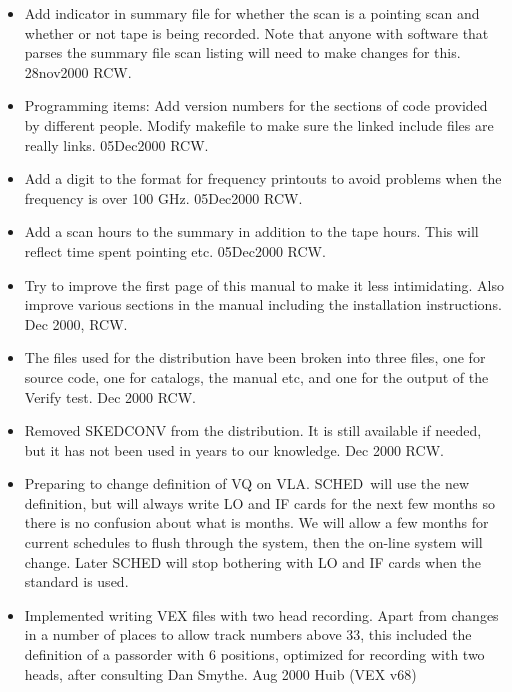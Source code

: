 \documentclass{report}
\newcommand{\schedb}{{\sc SCHED~}}
\begin{document}
\begin{itemize}
\item Add indicator in summary file for whether the scan is a pointing
      scan and whether or not tape is being recorded.  Note that
      anyone with software that parses the summary file scan listing
      will need to make changes for this.  28nov2000 RCW.

\item Programming items:  Add version numbers for the sections of
      code provided by different people.  Modify makefile to make
      sure the linked include files are really links.  05Dec2000 RCW.

\item Add a digit to the format for frequency printouts to avoid
      problems when the frequency is over 100 GHz.  05Dec2000 RCW.

\item Add a scan hours to the summary in addition to the tape hours.
      This will reflect time spent pointing etc.  05Dec2000 RCW.

\item Try to improve the first page of this manual to make it less
      intimidating.  Also improve various sections in the manual
      including the installation instructions.  Dec 2000, RCW.

\item The files used for the distribution have been broken into
      three files, one for source code, one for catalogs, the manual
      etc, and one for the output of the Verify test.  Dec 2000 RCW.

\item Removed {\sc SKEDCONV} from the distribution.  It is still
      available if needed, but it has not been used in years to
      our knowledge.  Dec 2000 RCW.

\item Preparing to change definition of VQ on VLA.  \schedb will use
      the new definition, but will always write LO and IF cards for the
      next few months so there is no confusion about what is months.  We
      will allow a few months for current schedules to flush through the
      system, then the on-line system will change.  Later SCHED will stop
      bothering with LO and IF cards when the standard is used.

\item Implemented writing VEX files with two head recording. Apart from
  changes in a number of places to allow track numbers above 33, this
  included the definition of a passorder with 6 positions, optimized
  for recording with two heads, after consulting Dan Smythe. Aug 2000
  Huib (VEX v68)


\end{itemize}
\end{document}
